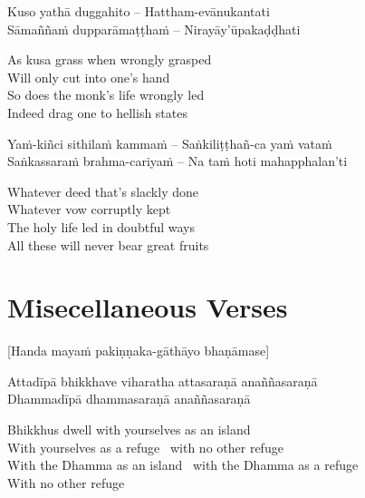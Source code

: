 \begin{twochants}
  Kuso yathā duggahito – Hattham-evānukantati\\
  Sāmaññaṁ dupparāmaṭṭhaṁ – Nirayāy’ūpakaḍḍhati\\
\end{twochants}

\begin{english}
  As kusa grass when wrongly grasped\\
  Will only cut into one’s hand\\
  So does the monk’s life wrongly led\\
  Indeed drag one to hellish states
\end{english}

\begin{twochants}
  Yaṁ-kiñci sithilaṁ kammaṁ – Saṅkiliṭṭhañ-ca yaṁ vataṁ\\
  Saṅkassaraṁ brahma-cariyaṁ – Na taṁ hoti mahapphalan’ti\\
\end{twochants}

\begin{english}
  Whatever deed that’s slackly done\\
  Whatever vow corruptly kept\\
  The holy life led in doubtful ways\\
  All these will never bear great fruits
\end{english}

\suttaRef{[SN 2.8]}


\section{Misecellaneous Verses}
\label{misc-verses}

\begin{center}
  [Handa mayaṁ pakiṇṇaka-gāthāyo bhaṇāmase]
\end{center}

\begin{twochants}
  Attadīpā bhikkhave viharatha attasaraṇā anaññasaraṇā\\
  Dhammadīpā dhammasaraṇā anaññasaraṇā\\
\end{twochants}

\begin{english}
  Bhikkhus dwell with yourselves as an island\\
  With yourselves as a refuge \breathmark\ with no other refuge\\
  With the Dhamma as an island \breathmark\ with the Dhamma as a refuge\\
  With no other refuge
\end{english}

